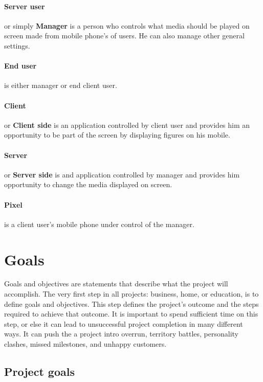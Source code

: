 \paragraph{Server user}
or simply \textbf{Manager} is a person who controls what media should be played on screen made from mobile phone's of users. 
He can also manage other general settings.

\paragraph{End user} is either manager or end client user.

\paragraph{Client} or \textbf{Client side} is an application controlled by client user and provides him an opportunity to be part of the screen by displaying figures on his mobile.

\paragraph{Server} or \textbf{Server side} is and application controlled by manager and provides him opportunity to change the media displayed on screen.

\paragraph{Pixel} is a client user's mobile phone under control of the manager.


\section{Goals}
Goals and objectives are statements that describe what the project will accomplish. The very first step in all projects: business, home, or education, is to define goals and objectives. 
This step defines the project's outcome and the steps required to achieve that outcome. 
It is important to spend sufficient time on this step, or else it can lead to unsuccessful project completion in many different ways. It can push the  a project intro overrun, territory battles, personality clashes, missed milestones, and unhappy customers. 
   
\label{sec:project-goals}

\subsection{Project goals}

